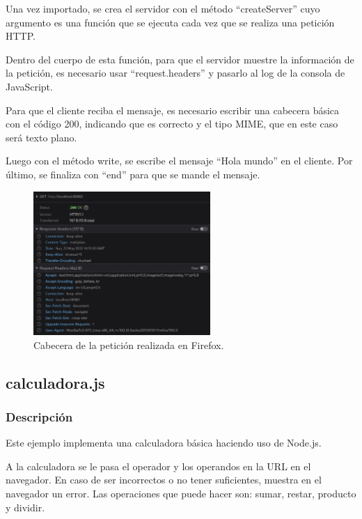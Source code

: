 \documentclass{article}
\begin{document}
Una vez importado, se crea el servidor con el método ``createServer'' cuyo argumento es una función que se ejecuta cada vez que se realiza una petición HTTP.

Dentro del cuerpo de esta función, para que el servidor muestre la información de la petición, es necesario usar ``request.headers'' y pasarlo al log de la consola de JavaScript.

Para que el cliente reciba el mensaje, es necesario escribir una cabecera básica con el código 200, indicando que es correcto y el tipo MIME, que en este caso será texto plano.

Luego con el método write, se escribe el mensaje ``Hola mundo'' en el cliente. Por último, se finaliza con ``end'' para que se mande el mensaje.

\begin{figure}[H]
    \centering
    \includegraphics[width=0.6\textwidth]{images/header.png}
    \caption{Cabecera de la petición realizada en Firefox.}
\end{figure}

\subsection{calculadora.js}
\subsubsection{Descripción}
Este ejemplo implementa una calculadora básica haciendo uso de Node.js. 

\bigskip

A la calculadora se le pasa el operador y los operandos en la URL en el navegador. En caso de ser incorrectos o no tener suficientes, muestra en el navegador un error. Las operaciones que puede hacer son: sumar, restar, producto y dividir.

\bigskip
\end{document}
